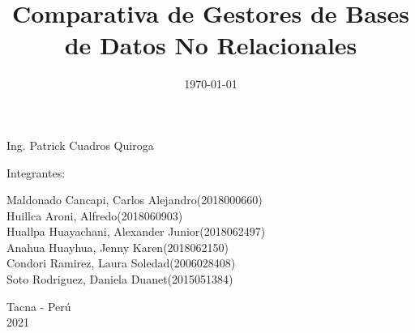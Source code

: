 \documentclass[twoside,twocolumn]{article}
\begin{document}
\begin{titlepage}
\begin{center}
\vspace*{0.1in}
\begin{large}
 Ing. Patrick Cuadros Quiroga\\
\end{large}

\vspace*{0.2in}
\vspace*{0.1in}
\begin{large}

Integrantes: \\
\begin{flushleft}
Maldonado Cancapi, Carlos Alejandro\hfill(2018000660) \\
Huillca Aroni, Alfredo\hfill(2018060903)\\
Huallpa Huayachani, Alexander Junior\hfill(2018062497)\\
Anahua Huayhua, Jenny Karen\hfill(2018062150)\\
Condori Ramirez, Laura Soledad\hfill(2006028408)\\
Soto Rodriguez, Daniela Duanet\hfill(2015051384)\\

\end{flushleft}
\end{large}

\vspace*{0.1in}
\begin{large}
Tacna - Perú\\
2021
\end{large}
\end{center}
\end{titlepage}

\setlength{\droptitle}{-4\baselineskip} %

\pretitle{\begin{center}\Huge\bfseries} %
\posttitle{\end{center}} %
\title{Comparativa de Gestores de Bases de Datos No Relacionales} %

\date{\today} %
\renewcommand{\maketitlehookd}{%

}




\maketitle
\end{document}
